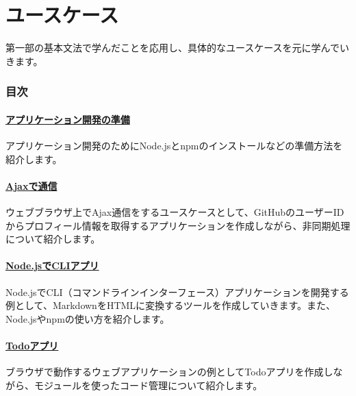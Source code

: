 \hypertarget{use-case}{%
\part{ユースケース}\label{use-case}}

第一部の基本文法で学んだことを応用し、具体的なユースケースを元に学んでいきます。

\hypertarget{summary}{%
\section*{目次}\label{summary}}

\hypertarget{setup-local-env}{%
\subsection*{\texorpdfstring{\href{./setup-local-env/README.md}{アプリケーション開発の準備}}{アプリケーション開発の準備}}\label{setup-local-env}}

アプリケーション開発のためにNode.jsとnpmのインストールなどの準備方法を紹介します。

\hypertarget{ajaxapp}{%
\subsection*{\texorpdfstring{\href{./ajaxapp/README.md}{Ajaxで通信}}{Ajaxで通信}}\label{ajaxapp}}

ウェブブラウザ上でAjax通信をするユースケースとして、GitHubのユーザーIDからプロフィール情報を取得するアプリケーションを作成しながら、非同期処理について紹介します。

\hypertarget{nodecli}{%
\subsection*{\texorpdfstring{\href{./nodecli/README.md}{Node.jsでCLIアプリ}}{Node.jsでCLIアプリ}}\label{nodecli}}

Node.jsでCLI（コマンドラインインターフェース）アプリケーションを開発する例として、MarkdownをHTMLに変換するツールを作成していきます。また、Node.jsやnpmの使い方を紹介します。

\hypertarget{todoapp}{%
\subsection*{\texorpdfstring{\href{./todoapp/README.md}{Todoアプリ}}{Todoアプリ}}\label{todoapp}}

ブラウザで動作するウェブアプリケーションの例としてTodoアプリを作成しながら、モジュールを使ったコード管理について紹介します。
